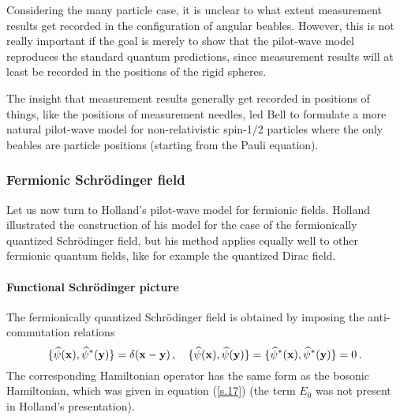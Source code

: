 \documentclass[12pt]{article}
\begin{document}
Considering the many particle case, it is unclear to what extent measurement results get recorded in the configuration of angular beables. However, this is not really important if the goal is merely to show that the pilot-wave model reproduces the standard quantum predictions, since measurement results will at least be recorded in the positions of the rigid spheres. 

The insight that measurement results generally get recorded in positions of things, like the positions of measurement needles, led Bell \cite{bell66,bell71} to formulate a more natural pilot-wave model for non-relativistic spin-1/2 particles where the only beables are particle positions (starting from the Pauli equation). 



\subsubsection{Fermionic Schr\"odinger field}\label{fermionicschrodinger}
Let us now turn to Holland's pilot-wave model for fermionic fields. Holland illustrated the construction of his model for the case of the fermionically quantized Schr{\"o}\-ding\-er field, but his method applies equally well to other fermionic quantum fields, like for example the quantized Dirac field. 

\paragraph{Functional Schr\"odinger picture}
The fermionically quantized Schr{\"o}\-ding\-er field is obtained by imposing the anti-commutation relations 
\begin{equation}
\{{\widehat \psi}({\bf x}),{\widehat \psi^*}({\bf y})\} = \delta({\bf x}-{\bf y})\,,\quad  \{ \widehat{\psi}({\bf x}),\widehat{\psi}({\bf y})\}=\{ \widehat{\psi}^*({\bf x}),\widehat{\psi}^*({\bf y})\}=0\,. 
\label{fh.0}
\end{equation}
The corresponding Hamiltonian operator has the same form as the bosonic Hamiltonian, which was given in equation (\ref{s.17}) (the term $E_0$ was not present in Holland's presentation). 
\end{document}

